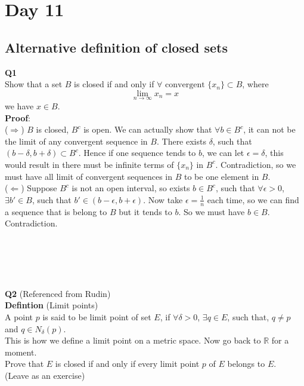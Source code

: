 \documentclass{article}
\newcommand{\tb}[1]{\textbf{#1}}
\begin{document}
\section{Day 11}
\subsection{Alternative definition of closed sets}
\tb{Q1}\\
Show that a set $B$ is closed if and only if $\forall \text{ convergent }\{x_n\}\subset B$, where
$$
\lim_{n \to \infty}x_n = x
$$
we have $x \in B$.\\
\tb{Proof}:\\
($\Longrightarrow$) $B$ is closed, $B^c$ is open. We can actually show that $\forall b \in B^c$, it can not be the limit of any convergent sequence in $B$. There exists $\delta$, 
such that $(b-\delta, b+\delta) \subset B^c$. Hence if one sequence tends to $b$, we can let $\epsilon = \delta$, this would result in there must be infinite terms of $\{x_n\}$ in 
$B^c$. Contradiction, so we must have all limit of convergent sequences in $B$ to be one element in $B$.\\
($\Longleftarrow$) Suppose $B^c$ is not an open interval, so exists $b \in B^c$, such that $\forall \epsilon > 0$, $\exists b' \in B$, such that $b' \in (b-\epsilon, b+ \epsilon)$. Now 
take $\epsilon = \frac{1}{n}$ each time, so we can find a sequence that is belong to $B$ but it tends to $b$. So we must have $b \in B$. Contradiction.\\
\\
\\
\\
\\
\\
\tb{Q2} (Referenced from Rudin)\\
\tb{Defintion} (Limit points)\\
A point $p$ is said to be limit point of set $E$, if $\forall \delta > 0$, $\exists q \in E$, such that, $q \ne p$ and $q \in N_\delta(p)$.\\
This is how we define a limit point on a metric space. Now go back to $\mathbb{R}$ for a moment.\\
Prove that $E$ is closed if and only if every limit point $p$ of $E$ belongs to $E$.\\
(Leave as an exercise)\\
\\
\\
\\
\\
\\
\end{document}
